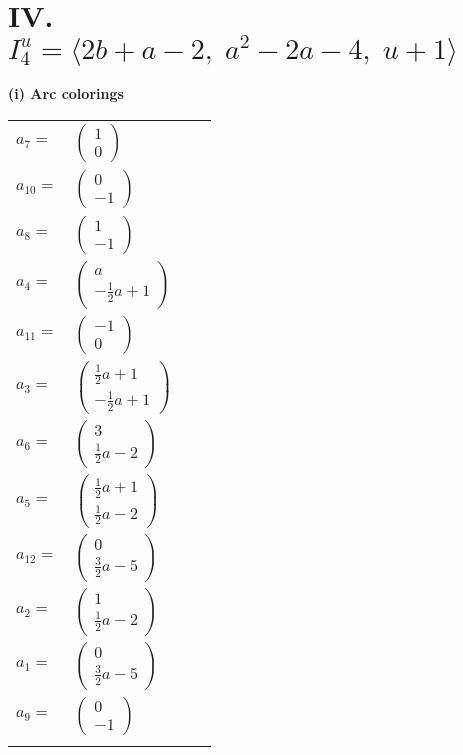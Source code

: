 \documentclass[1p]{elsarticle_modified}
\theoremstyle{definition}
\begin{document}
\centering \section*{IV. $I^u_{4}= \langle 2 b+a-2,\;a^2-2 a-4,\;u+1 \rangle$}
\flushleft \textbf{(i) Arc colorings}\\
\begin{tabular}{m{7pt} m{180pt} m{7pt} m{180pt} }
\flushright $a_{7}=$&$\begin{pmatrix}1\\0\end{pmatrix}$ \\
\flushright $a_{10}=$&$\begin{pmatrix}0\\-1\end{pmatrix}$ \\
\flushright $a_{8}=$&$\begin{pmatrix}1\\-1\end{pmatrix}$ \\
\flushright $a_{4}=$&$\begin{pmatrix}a\\-\frac{1}{2} a+1\end{pmatrix}$ \\
\flushright $a_{11}=$&$\begin{pmatrix}-1\\0\end{pmatrix}$ \\
\flushright $a_{3}=$&$\begin{pmatrix}\frac{1}{2} a+1\\-\frac{1}{2} a+1\end{pmatrix}$ \\
\flushright $a_{6}=$&$\begin{pmatrix}3\\\frac{1}{2} a-2\end{pmatrix}$ \\
\flushright $a_{5}=$&$\begin{pmatrix}\frac{1}{2} a+1\\\frac{1}{2} a-2\end{pmatrix}$ \\
\flushright $a_{12}=$&$\begin{pmatrix}0\\\frac{3}{2} a-5\end{pmatrix}$ \\
\flushright $a_{2}=$&$\begin{pmatrix}1\\\frac{1}{2} a-2\end{pmatrix}$ \\
\flushright $a_{1}=$&$\begin{pmatrix}0\\\frac{3}{2} a-5\end{pmatrix}$ \\
\flushright $a_{9}=$&$\begin{pmatrix}0\\-1\end{pmatrix}$\\&\end{tabular}
\end{document}
